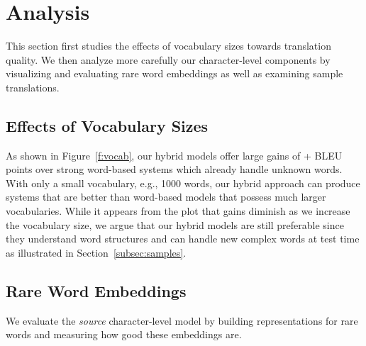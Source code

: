 \section{Analysis}
\label{sec:analysis}
This section first studies the effects of vocabulary sizes towards
translation quality. We then analyze more carefully 
our character-level components by visualizing and evaluating rare word
embeddings as well as examining sample translations.

\subsection{Effects of Vocabulary Sizes}
As shown in Figure~\ref{f:vocab}, our hybrid models offer large gains of
+\gain{} BLEU points over strong word-based systems which already handle unknown words.
With only a small vocabulary, e.g., 1000 words, our hybrid approach can produce
systems that are better than word-based models that possess much larger
vocabularies. While it appears from the plot that gains diminish as we
increase the vocabulary size, we argue that our hybrid models are still
preferable since they understand word structures and can handle new complex
words at test time as illustrated in Section~\ref{subsec:samples}.


\subsection{Rare Word Embeddings}
We evaluate the {\it source} character-level model by building representations
for rare words and measuring how good these embeddings are.

